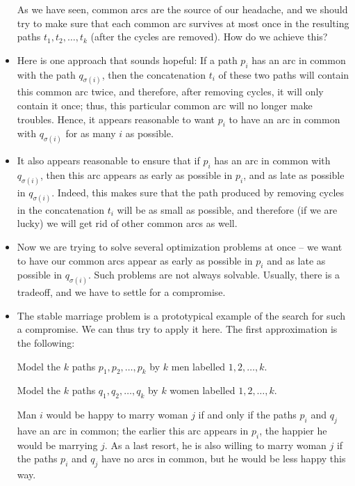\documentclass[numbers=enddot,12pt,final,onecolumn,notitlepage]{scrartcl}%
\theoremstyle{definition}
\newcommand{\tup}[1]{\left( #1 \right)}
\begin{document}
\begin{itemize}
      As we have seen, common arcs are the source of our headache, and
      we should try to make sure that each common arc survives at most
      once in the resulting paths $t_1, t_2, \ldots, t_k$ (after
      the cycles are removed).
      How do we achieve this?
\item Here is one approach that sounds hopeful:
      If a path $p_i$ has an arc in common with the path
      $q_{\sigma \tup{i}}$, then the concatenation $t_i$ of these two
      paths will contain this common arc twice,
      and therefore, after removing cycles, it will only contain it
      once; thus, this particular common arc will no longer make
      troubles.
      Hence, it appears reasonable to want $p_i$ to have an arc in
      common with $q_{\sigma \tup{i}}$ for as many $i$ as possible.
\item It also appears reasonable to ensure that if $p_i$ has an arc in
      common with $q_{\sigma \tup{i}}$, then this arc appears as early
      as possible in $p_i$, and as late as possible in
      $q_{\sigma \tup{i}}$.
      Indeed, this makes sure that the path produced by removing
      cycles in the concatenation $t_i$ will be as small as possible,
      and therefore (if we are lucky) we will get rid of other common
      arcs as well.
\item Now we are trying to solve several optimization problems at once
      -- we want to have our common arcs appear as early as possible
      in $p_i$ and as late as possible in $q_{\sigma \tup{i}}$.
      Such problems are not always solvable.
      Usually, there is a tradeoff, and we have to settle for a
      compromise.
\item The stable marriage problem is a prototypical example of the
      search for such a compromise.
      We can thus try to apply it here.
      The first approximation is the following: \par
      Model the $k$ paths $p_1, p_2, \ldots, p_k$ by $k$ men
      labelled $1, 2, \ldots, k$. \par
      Model the $k$ paths $q_1, q_2, \ldots, q_k$ by $k$ women
      labelled $1, 2, \ldots, k$. \par
      Man $i$ would be happy to marry woman $j$ if and only if the
      paths $p_i$ and $q_j$ have an arc in common; the earlier this
      arc appears in $p_i$, the happier he would be marrying $j$.
      As a last resort, he is also willing to marry woman $j$ if the
      paths $p_i$ and $q_j$ have no arcs in common, but he would be
      less happy this way. \par

\end{itemize}
\end{document}
